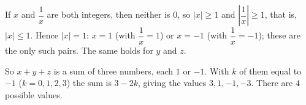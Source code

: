 If $x$ and $\dfrac1x$ are both integers, then neither is $0$, so $|x|\ge1$ and $\left|\dfrac1x\right|\ge1$, that is, $|x|\le1$. Hence $|x|=1$: $x=1$ (with $\dfrac1x=1$) or $x=-1$ (with $\dfrac1x=-1$); these are the only such pairs. The same holds for $y$ and $z$.

So $x+y+z$ is a sum of three numbers, each $1$ or $-1$. With $k$ of them equal to $-1$ ($k=0,1,2,3$) the sum is $3-2k$, giving the values $3,1,-1,-3$. There are $\boxed{4}$ possible values.
